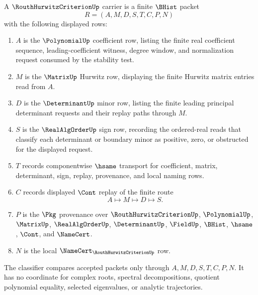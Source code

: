 \begin{definition}
\label{def:routh-hurwitz-criterion-carrier}
A $\RouthHurwitzCriterionUp$ carrier is a finite $\BHist$ packet
$$
R=(A,M,D,S,T,C,P,N)
$$
with the following displayed rows:
\begin{enumerate}
\item $A$ is the $\PolynomialUp$ coefficient row, listing the finite real coefficient sequence, leading-coefficient witness, degree window, and normalization request consumed by the stability test.
\item $M$ is the $\MatrixUp$ Hurwitz row, displaying the finite Hurwitz matrix entries read from $A$.
\item $D$ is the $\DeterminantUp$ minor row, listing the finite leading principal determinant requests and their replay paths through $M$.
\item $S$ is the $\RealAlgOrderUp$ sign row, recording the ordered-real reads that classify each determinant or boundary minor as positive, zero, or obstructed for the displayed request.
\item $T$ records componentwise $\hsame$ transport for coefficient, matrix, determinant, sign, replay, provenance, and local naming rows.
\item $C$ records displayed $\Cont$ replay of the finite route
$$
A \longmapsto M \longmapsto D \longmapsto S .
$$
\item $P$ is the $\Pkg$ provenance over $\RouthHurwitzCriterionUp$, $\PolynomialUp$, $\MatrixUp$, $\RealAlgOrderUp$, $\DeterminantUp$, $\FieldUp$, $\BHist$, $\hsame$, $\Cont$, and $\NameCert$.
\item $N$ is the local $\NameCert_{\RouthHurwitzCriterionUp}$ row.
\end{enumerate}
The classifier compares accepted packets only through $A,M,D,S,T,C,P,N$. It has no coordinate for complex roots, spectral decompositions, quotient polynomial equality, selected eigenvalues, or analytic trajectories.
\end{definition}

